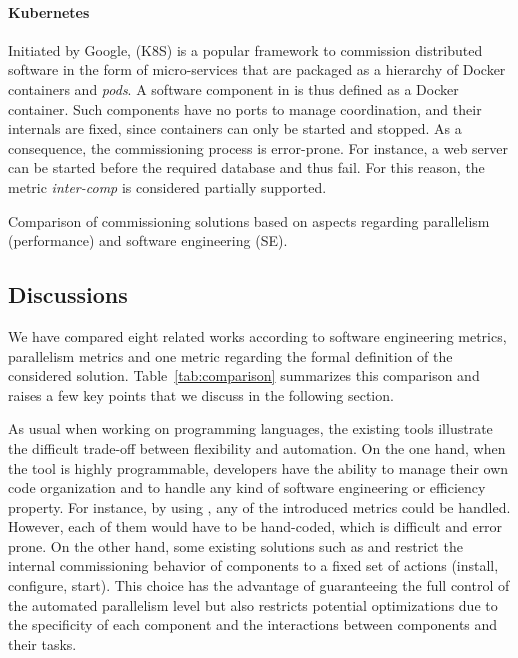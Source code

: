 \paragraph{Kubernetes}
Initiated by Google, \kubernetes (K8S) is a popular framework to
commission distributed software in the form of micro-services that are
packaged as a hierarchy of Docker containers and \emph{pods}. A
software component in \kubernetes is thus defined as a Docker
container. Such components have no ports to manage coordination, and
their internals are fixed, since containers can only be started and
stopped. As a consequence, the commissioning process is
error-prone. For instance, a web server can be started before the
required database and thus fail. For this reason, the metric
\emph{inter-comp} is considered partially supported.

\begin{table*}[tp]
  \centering
  \small
  
  \caption{Comparison of commissioning solutions based on aspects
  regarding parallelism (performance) and software engineering (SE).}
  \label{tab:comparison}
\end{table*}

\subsection{Discussions}

We have compared eight related works according to software engineering metrics, parallelism
metrics and one metric regarding the formal definition of the
considered solution. Table~\ref{tab:comparison} summarizes this
comparison and raises a few key points that we discuss in the
following section.

As usual when working on programming languages, the existing
tools illustrate the difficult trade-off between flexibility and
automation. On the one hand, when the tool is highly programmable,
developers have the ability to manage their own code organization and
to handle any kind of software engineering or efficiency property. For
instance, by using \shell, any of the introduced metrics could be
handled. However, each of them would have to be hand-coded, which is
difficult and error prone. On the other hand, some existing solutions
such as \deployware and \juju restrict the internal commissioning
behavior of components to a fixed set of actions (\eg install,
configure, start). This choice has the advantage of guaranteeing the
full control of the automated parallelism level but also restricts
potential optimizations due to the specificity of each component and
the interactions between components and their tasks.

